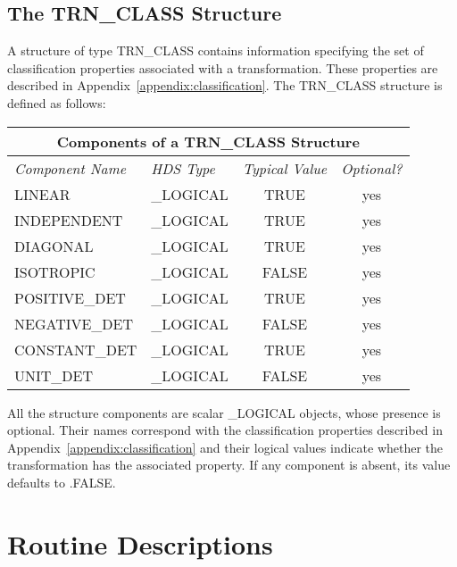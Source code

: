 \documentclass[twoside,nolof,11pt]{starlink}
\providecommand{\name}[1]{\small{#1}}
\begin{document}
\subsection{The \name{TRN\_CLASS} Structure}

A structure of type \name{TRN\_CLASS} contains information specifying the
set of classification properties associated with a transformation.
These properties are described in Appendix~\ref{appendix:classification}.
The \name{TRN\_CLASS} structure is defined as follows:

\begin{center}

\begin{tabular}{|llc|c|}
\hline
\multicolumn{4}{|c|}{\textbf{Components of a \name{TRN\_CLASS} Structure}} \\
\hline
\hline
\emph{Component Name} & \emph{\name{HDS} Type} & \emph{Typical Value} & \emph{Optional?} \\ \hline
LINEAR & \_LOGICAL & TRUE & yes \\
INDEPENDENT & \_LOGICAL & TRUE & yes \\
DIAGONAL & \_LOGICAL & TRUE & yes \\
ISOTROPIC & \_LOGICAL & FALSE & yes \\
POSITIVE\_DET & \_LOGICAL & TRUE & yes \\
NEGATIVE\_DET & \_LOGICAL & FALSE & yes \\
CONSTANT\_DET & \_LOGICAL & TRUE & yes \\
UNIT\_DET & \_LOGICAL & FALSE & yes \\
\hline
\end{tabular}

\end{center}

All the structure components are scalar \name{\_LOGICAL} objects, whose
presence is optional.
Their names correspond with the classification properties described in
Appendix~\ref{appendix:classification} and their logical values indicate
whether the transformation has the associated property. If any component is
absent, its value defaults to \name{.FALSE.}



\newpage
\section{Routine Descriptions}
\label{appendix_routines}
\end{document}
